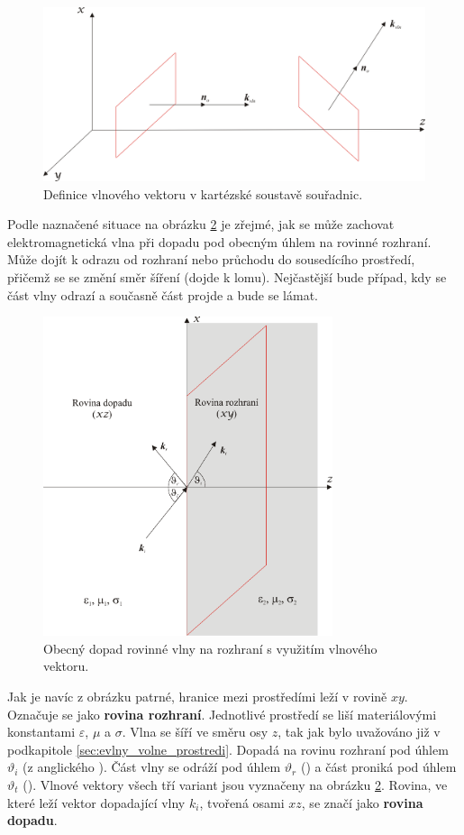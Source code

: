 \begin{figure}[!h]
	\centering
	\includegraphics[width=13cm]{evlny_vlnovy_vektor.png}
	\caption{Definice vlnového vektoru v kartézské soustavě souřadnic.\cite{emp}}
	\label{obr:evlny_vlnovy_vektor}
\end{figure}

Podle naznačené situace na obrázku \ref{obr:evlny_rovinne_rozhrani} je zřejmé, jak se může zachovat elektromagnetická vlna při dopadu pod obecným úhlem na rovinné rozhraní. Může dojít k odrazu od rozhraní nebo průchodu do sousedícího prostředí, přičemž se se změní směr šíření (dojde k lomu). Nejčastější bude případ, kdy se část vlny odrazí a současně část projde a bude se lámat. 

\begin{figure}[!h]
	\centering
	\includegraphics[width=8.5cm]{evlny_rovinne_rozhrani.png}
	\caption{Obecný dopad rovinné vlny na rozhraní s využitím vlnového vektoru.}
	\label{obr:evlny_rovinne_rozhrani}
\end{figure}

Jak je navíc z obrázku patrné, hranice mezi prostředími leží v rovině $xy$. Označuje se jako {\bf rovina rozhraní}. Jednotlivé prostředí se liší materiálovými konstantami $\varepsilon$, $\mu$ a $\sigma$. Vlna se šíří ve směru osy $z$, tak jak bylo uvažováno již v podkapitole \ref{sec:evlny_volne_prostredi}. Dopadá na rovinu rozhraní pod úhlem $\vartheta_{i}$ (z anglického ). Část vlny se odráží pod úhlem $\vartheta_{r}$ () a část proniká pod úhlem $\vartheta_{t}$ (). Vlnové vektory všech tří variant jsou vyznačeny na obrázku \ref{obr:evlny_rovinne_rozhrani}. Rovina, ve které leží vektor dopadající vlny $k_{i}$, tvořená osami $xz$, se značí jako {\bf rovina dopadu}.

